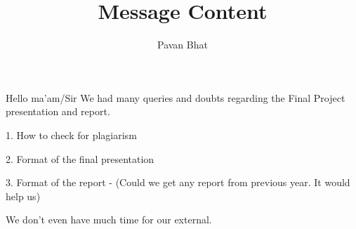 \documentclass[12pt]{article}
\title{Message Content}
\author{Pavan Bhat}
\begin{document}
\maketitle
Hello ma'am/Sir We had many queries and doubts regarding the Final Project presentation and report.

1. How to check for plagiarism

2. Format of the final presentation

3. Format of the report - (Could we get any report from previous year. It would help us)


We don't even have much time for our external.
\end{document}
